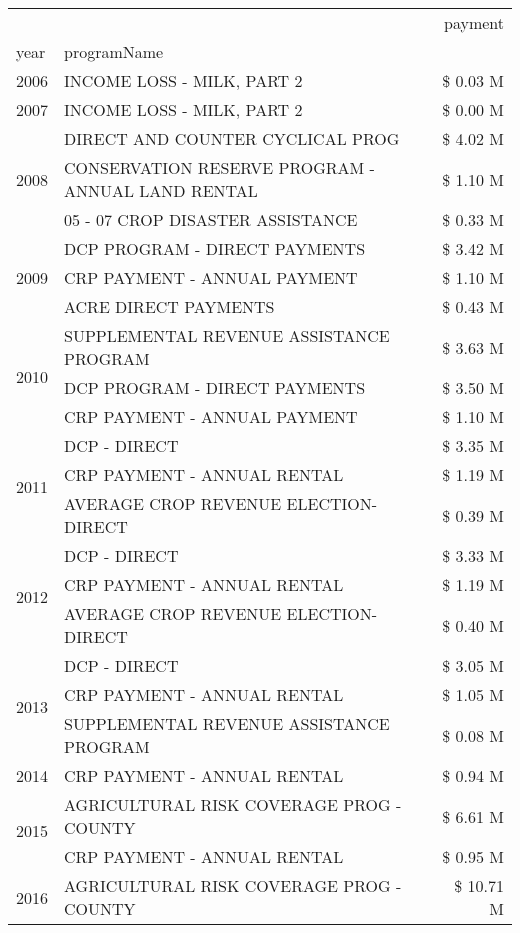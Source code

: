 \begin{tabular}{llr}
\toprule
 &  & payment \\
year & programName &  \\
\midrule
2006 & INCOME LOSS - MILK, PART 2 & \$ 0.03 M \\
\cline{1-3}
2007 & INCOME LOSS - MILK, PART 2 & \$ 0.00 M \\
\cline{1-3}
\multirow[t]{3}{*}{2008} & DIRECT AND COUNTER CYCLICAL PROG & \$ 4.02 M \\
 & CONSERVATION RESERVE PROGRAM - ANNUAL LAND RENTAL & \$ 1.10 M \\
 & 05 - 07 CROP DISASTER ASSISTANCE & \$ 0.33 M \\
\cline{1-3}
\multirow[t]{3}{*}{2009} & DCP PROGRAM - DIRECT PAYMENTS & \$ 3.42 M \\
 & CRP PAYMENT - ANNUAL PAYMENT & \$ 1.10 M \\
 & ACRE DIRECT PAYMENTS & \$ 0.43 M \\
\cline{1-3}
\multirow[t]{3}{*}{2010} & SUPPLEMENTAL REVENUE ASSISTANCE PROGRAM & \$ 3.63 M \\
 & DCP PROGRAM - DIRECT PAYMENTS & \$ 3.50 M \\
 & CRP PAYMENT - ANNUAL PAYMENT & \$ 1.10 M \\
\cline{1-3}
\multirow[t]{3}{*}{2011} & DCP - DIRECT & \$ 3.35 M \\
 & CRP PAYMENT - ANNUAL RENTAL & \$ 1.19 M \\
 & AVERAGE CROP REVENUE ELECTION-DIRECT & \$ 0.39 M \\
\cline{1-3}
\multirow[t]{3}{*}{2012} & DCP - DIRECT & \$ 3.33 M \\
 & CRP PAYMENT - ANNUAL RENTAL & \$ 1.19 M \\
 & AVERAGE CROP REVENUE ELECTION-DIRECT & \$ 0.40 M \\
\cline{1-3}
\multirow[t]{3}{*}{2013} & DCP - DIRECT & \$ 3.05 M \\
 & CRP PAYMENT - ANNUAL RENTAL & \$ 1.05 M \\
 & SUPPLEMENTAL REVENUE ASSISTANCE PROGRAM & \$ 0.08 M \\
\cline{1-3}
2014 & CRP PAYMENT - ANNUAL RENTAL & \$ 0.94 M \\
\cline{1-3}
\multirow[t]{2}{*}{2015} & AGRICULTURAL RISK COVERAGE PROG - COUNTY & \$ 6.61 M \\
 & CRP PAYMENT - ANNUAL RENTAL & \$ 0.95 M \\
\cline{1-3}
\multirow[t]{3}{*}{2016} & AGRICULTURAL RISK COVERAGE PROG - COUNTY & \$ 10.71 M \\

\end{tabular}
